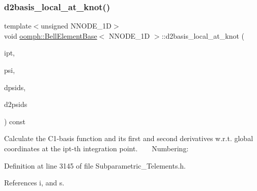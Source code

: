 \subsubsection{\texorpdfstring{d2basis\+\_\+local\+\_\+at\+\_\+knot()}{d2basis\_local\_at\_knot()}}
{\footnotesize\ttfamily template$<$unsigned N\+N\+O\+D\+E\+\_\+1D$>$ \\
void \hyperlink{classoomph_1_1BellElementBase}{oomph\+::\+Bell\+Element\+Base}$<$ N\+N\+O\+D\+E\+\_\+1D $>$\+::d2basis\+\_\+local\+\_\+at\+\_\+knot (\begin{DoxyParamCaption}\item[{const unsigned \&}]{ipt,  }\item[{\hyperlink{classoomph_1_1Shape}{Shape} \&}]{psi,  }\item[{\hyperlink{classoomph_1_1DShape}{D\+Shape} \&}]{dpsids,  }\item[{\hyperlink{classoomph_1_1DShape}{D\+Shape} \&}]{d2psids }\end{DoxyParamCaption}) const\hspace{0.3cm}{\ttfamily [inline]}}

Calculate the C1-\/basis function and its first and second derivatives w.\+r.\+t. global coordinates at the ipt-\/th integration point. ~\newline
~\newline
 Numbering\+: 

Definition at line 3145 of file Subparametric\+\_\+\+Telements.\+h.



References i, and s.

\mbox{\label{classoomph_1_1BellElementBase_a8bf466c908c0c3cf661229429961d5d0}} 
